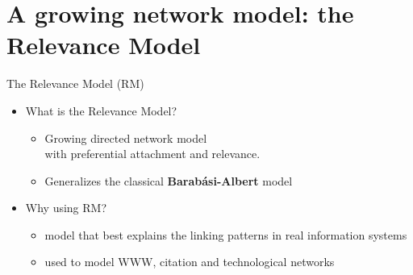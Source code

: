 \section{A growing network model: the Relevance Model}

\begin{frame}{The Relevance Model (RM)}
    \begin{itemize}
        \item \alert{What} is the Relevance Model?
        \begin{itemize}
            \item Growing directed network model \\ with \alert{preferential attachment} and \alert{relevance}.
            \item Generalizes the classical \textbf{Barabási-Albert} model
        \end{itemize}

        \item \alert{Why} using RM?
        \begin{itemize}
            \item model that best explains the linking patterns in real information systems
            \item used to model WWW, citation and technological networks
        \end{itemize}
    \end{itemize}
\end{frame}

